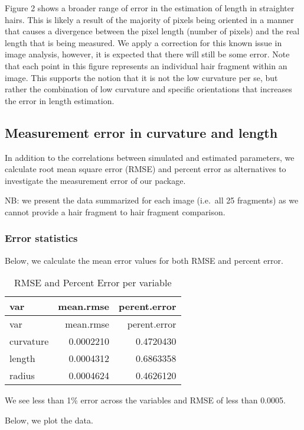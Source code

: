 \documentclass[
]{article}
\begin{document}
Figure 2 shows a broader range of error in the estimation of length in
straighter hairs. This is likely a result of the majority of pixels
being oriented in a manner that causes a divergence between the pixel
length (number of pixels) and the real length that is being measured. We
apply a correction for this known issue in image analysis, however, it
is expected that there will still be some error. Note that each point in
this figure represents an individual hair fragment within an image. This
supports the notion that it is not the low curvature per se, but rather
the combination of low curvature and specific orientations that
increases the error in length estimation.

\hypertarget{measurement-error-in-curvature-and-length}{%
\subsection{Measurement error in curvature and
length}\label{measurement-error-in-curvature-and-length}}

In addition to the correlations between simulated and estimated
parameters, we calculate root mean square error (RMSE) and percent error
as alternatives to investigate the measurement error of our package.

NB: we present the data summarized for each image (i.e.~all 25
fragments) as we cannot provide a hair fragment to hair fragment
comparison.

\hypertarget{error-statistics}{%
\subsubsection{Error statistics}\label{error-statistics}}

Below, we calculate the mean error values for both RMSE and percent
error.

\begin{longtable}[]{@{}lrr@{}}
\caption{RMSE and Percent Error per variable}\tabularnewline
\toprule
var & mean.rmse & perent.error\tabularnewline
\midrule
\endfirsthead
\toprule
var & mean.rmse & perent.error\tabularnewline
\midrule
\endhead
curvature & 0.0002210 & 0.4720430\tabularnewline
length & 0.0004312 & 0.6863358\tabularnewline
radius & 0.0004624 & 0.4626120\tabularnewline
\bottomrule
\end{longtable}

We see less than 1\% error across the variables and RMSE of less than
0.0005.

Below, we plot the data.
\end{document}
